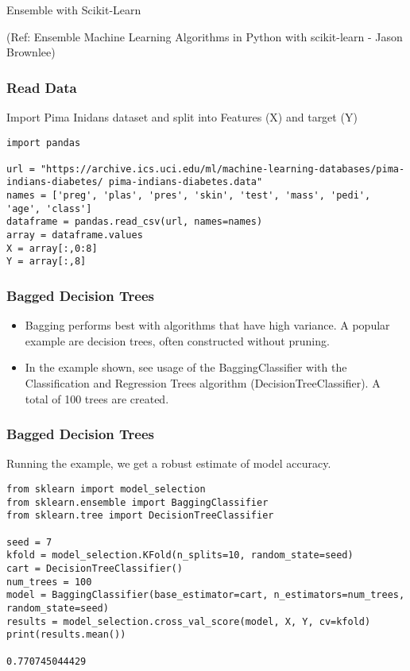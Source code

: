 \begin{frame}[fragile]\frametitle{}
\begin{center}
{\Large Ensemble with Scikit-Learn}

{\tiny (Ref: Ensemble Machine Learning Algorithms in Python with scikit-learn - Jason Brownlee)}
\end{center}
\end{frame}

\begin{frame}[fragile]\frametitle{Read Data}
Import Pima Inidans dataset and split into Features (X) and target (Y)
\begin{lstlisting}
import pandas

url = "https://archive.ics.uci.edu/ml/machine-learning-databases/pima-indians-diabetes/ pima-indians-diabetes.data"
names = ['preg', 'plas', 'pres', 'skin', 'test', 'mass', 'pedi', 'age', 'class']
dataframe = pandas.read_csv(url, names=names)
array = dataframe.values
X = array[:,0:8]
Y = array[:,8]
\end{lstlisting}
\end{frame}

\begin{frame}[fragile]\frametitle{Bagged Decision Trees}

	\begin{itemize}
	\item Bagging performs best with algorithms that have high variance. A popular example are decision trees, often constructed without pruning.
	\item In the example shown, see usage of the BaggingClassifier with the Classification and Regression Trees algorithm (DecisionTreeClassifier). A total of 100 trees are created.
	\end{itemize}
	
\end{frame}

\begin{frame}[fragile]\frametitle{Bagged Decision Trees}
Running the example, we get a robust estimate of model accuracy.

\begin{lstlisting}
from sklearn import model_selection
from sklearn.ensemble import BaggingClassifier
from sklearn.tree import DecisionTreeClassifier

seed = 7
kfold = model_selection.KFold(n_splits=10, random_state=seed)
cart = DecisionTreeClassifier()
num_trees = 100
model = BaggingClassifier(base_estimator=cart, n_estimators=num_trees, random_state=seed)
results = model_selection.cross_val_score(model, X, Y, cv=kfold)
print(results.mean())

0.770745044429
\end{lstlisting}
\end{frame}



